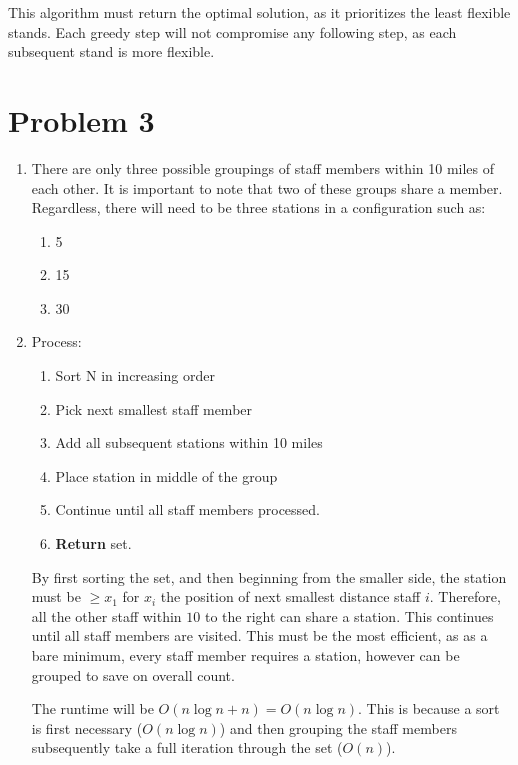 \documentclass{article}
\begin{document}
This algorithm must return the optimal solution, as it prioritizes the least flexible stands.
Each greedy step will not compromise any following step, as each subsequent stand is more flexible.

\section{Problem 3}

\begin{enumerate}[label=\alph*)]
    \item There are only three possible groupings of staff members within 10 miles of each other.
        It is important to note that two of these groups share a member.
        Regardless, there will need to be three stations in a configuration such as:
        \begin{enumerate}[label={Station \arabic*:}, leftmargin=*]
            \item 5
            \item 15
            \item 30
        \end{enumerate}
    \item Process:
        \begin{enumerate}[label=\arabic*:]
            \item Sort N in increasing order
            \item Pick next smallest staff member
            \item Add all subsequent stations within 10 miles
            \item Place station in middle of the group
            \item Continue until all staff members processed.
            \item \textbf{Return} set.
        \end{enumerate}
        
        By first sorting the set, and then beginning from the smaller side,
        the station must be $\geq x_1$ for $x_i$ the position of next smallest
        distance staff $i$. Therefore, all the other staff within $10$ to the right
        can share a station. This continues until all staff members are visited.
        This must be the most efficient, as as a bare minimum, every staff member
        requires a station, however can be grouped to save on overall count.

        The runtime will be $O(n \log{n} + n) = O(n \log{n})$.
        This is because a sort is first necessary ($O(n \log{n})$)
        and then grouping the staff members subsequently
        take a full iteration through the set ($O(n)$).


\end{enumerate}
\end{document}
